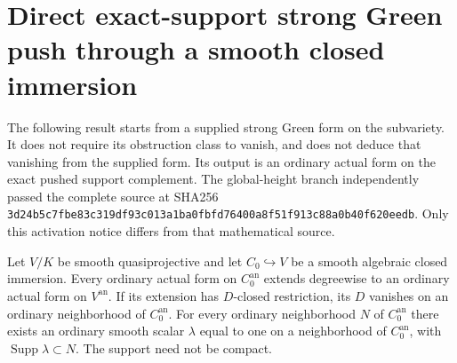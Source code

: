 \section{Direct exact-support strong Green push through a smooth closed immersion}
\label{r16gp:section}

The following result starts from a supplied strong Green form on the
subvariety.  It does not require its obstruction class to vanish, and
does not deduce that vanishing from the supplied form.  Its output
is an ordinary actual form on the exact pushed support complement.
The global-height branch independently passed the complete source
at SHA256
\texttt{3d24b5c7fbe83c319df93c013a1ba0fbfd76400a8f51f913c88a0b40f620eedb}.
Only this activation notice differs from that mathematical source.

\begin{lemma}
\label{r16gp:open-extension}
Let $V/K$ be smooth quasiprojective and let $C_0\hookrightarrow V$
be a smooth algebraic closed immersion.  Every ordinary actual form
on $C_0^{\mathrm{an}}$ extends degreewise to an ordinary actual form
on $V^{\mathrm{an}}$.  If its extension has $D$-closed restriction,
its $D$ vanishes on an ordinary neighborhood of $C_0^{\mathrm{an}}$.
For every ordinary neighborhood $N$ of $C_0^{\mathrm{an}}$ there
exists an ordinary smooth scalar $\lambda$ equal to one on a
neighborhood of $C_0^{\mathrm{an}}$, with
$\operatorname{Supp}\lambda\subset N$.  The support need not be compact.
\end{lemma}

